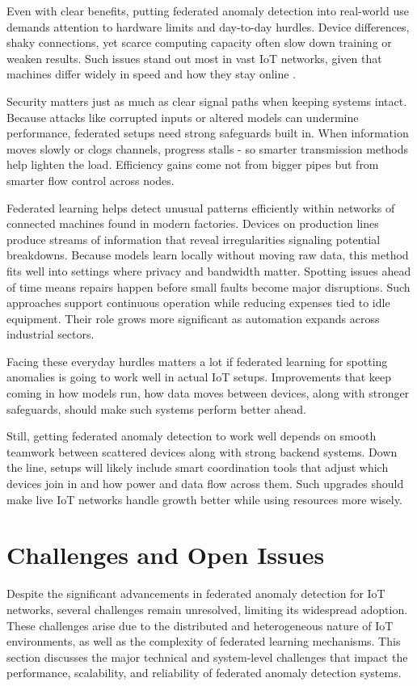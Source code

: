 \documentclass[12pt]{article}
\begin{document}
Even with clear benefits, putting federated anomaly detection into real-world use demands attention to hardware limits and day-to-day hurdles. Device differences, shaky connections, yet scarce computing capacity often slow down training or weaken results. Such issues stand out most in vast IoT networks, given that machines differ widely in speed and how they stay online \cite{paper7,paper8}.

Security matters just as much as clear signal paths when keeping systems intact. Because attacks like corrupted inputs or altered models can undermine performance, federated setups need strong safeguards built in. When information moves slowly or clogs channels, progress stalls - so smarter transmission methods help lighten the load. Efficiency gains come not from bigger pipes but from smarter flow control across nodes.

Federated learning helps detect unusual patterns efficiently within networks of connected machines found in modern factories. Devices on production lines produce streams of information that reveal irregularities signaling potential breakdowns. Because models learn locally without moving raw data, this method fits well into settings where privacy and bandwidth matter. Spotting issues ahead of time means repairs happen before small faults become major disruptions. Such approaches support continuous operation while reducing expenses tied to idle equipment. Their role grows more significant as automation expands across industrial sectors.

Facing these everyday hurdles matters a lot if federated learning for spotting anomalies is going to work well in actual IoT setups. Improvements that keep coming in how models run, how data moves between devices, along with stronger safeguards, should make such systems perform better ahead.

Still, getting federated anomaly detection to work well depends on smooth teamwork between scattered devices along with strong backend systems. Down the line, setups will likely include smart coordination tools that adjust which devices join in and how power and data flow across them. Such upgrades should make live IoT networks handle growth better while using resources more wisely.


	\section{Challenges and Open Issues}
	
Despite the significant advancements in federated anomaly detection for IoT networks, several challenges remain unresolved, limiting its widespread adoption. These challenges arise due to the distributed and heterogeneous nature of IoT environments, as well as the complexity of federated learning mechanisms. This section discusses the major technical and system-level challenges that impact the performance, scalability, and reliability of federated anomaly detection systems.
\end{document}
